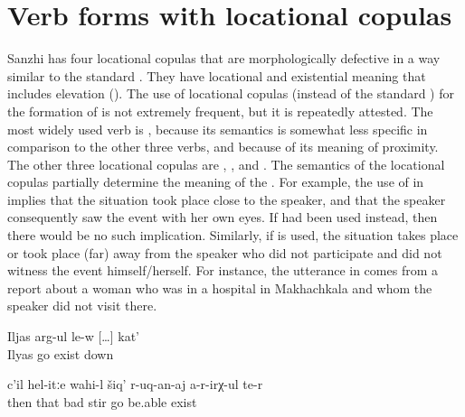 
\section{Verb forms with locational copulas}
\label{sec:Verb forms with locational copulae}

Sanzhi has four locational copulas that are morphologically defective in a way similar to the standard . They have locational and existential meaning that includes elevation (). The use of locational copulas (instead of the standard ) for the formation of  is not extremely frequent, but it is repeatedly attested. The most widely used  verb is  , because its semantics is somewhat less specific in comparison to the other three  verbs, and because of its meaning of proximity. The other three locational copulas are  ,  , and  . The semantics of the locational copulas partially determine the meaning of the . For example, the use of  in  implies that the situation took place close to the speaker, and that the speaker consequently saw the event with her own eyes. If  had been used instead, then there would be no such implication. Similarly, if  is used, the situation takes place or took place (far) away from the speaker who did not participate and did not witness the event himself/herself. For instance, the utterance in  comes from a report about a woman who was in a hospital in Makhachkala and whom the speaker did not visit there.
%
\begin{exe}
	\ex	\label{ex:Ilja is going downwards periphrastic}
	\gll	Iljas	arg-ul	le-w	[\ldots]	kat'\\
		Ilyas	go	exist	{}	down\\
	\glt	{}
	
	\ex	\label{ex:Then, badly like this, she is not able to move}
	\gll	c'il	hel-itːe	wahi-l	šiq'	r-uq-an-aj	a-r-irχ-ul	te-r\\
		then	that\tsc{-advz}	bad	stir	go be.able exist\\
	\glt	{}

\end{exe}


